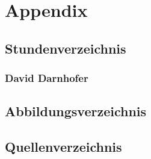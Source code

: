 
\section{Appendix}

\subsection{Stundenverzeichnis}

\subsubsection{David Darnhofer}

\subsection{Abbildungsverzeichnis}
\listoffigures

\subsection{Quellenverzeichnis}
% 
% 